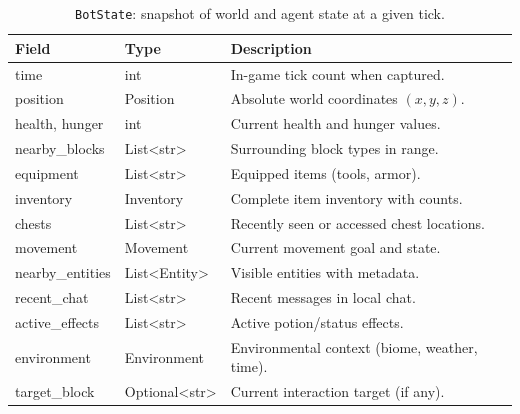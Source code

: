 \begin{table}[!htbp]
  \centering
  \caption{\texttt{BotState}: snapshot of world and agent state at a given tick.}
  \label{tab:botstate}
  \begin{tabularx}{\linewidth}{@{} l l X @{}}
    \toprule
    \textbf{Field} & \textbf{Type} & \textbf{Description} \\
    \midrule
    time & int & In-game tick count when captured. \\
    position & Position & Absolute world coordinates \((x,y,z)\). \\
    health, hunger & int & Current health and hunger values. \\
    nearby\_blocks & List\textless{}str\textgreater{} & Surrounding block types in range. \\
    equipment & List\textless{}str\textgreater{} & Equipped items (tools, armor). \\
    inventory & Inventory & Complete item inventory with counts. \\
    chests & List\textless{}str\textgreater{} & Recently seen or accessed chest locations. \\
    movement & Movement & Current movement goal and state. \\
    nearby\_entities & List\textless{}Entity\textgreater{} & Visible entities with metadata. \\
    recent\_chat & List\textless{}str\textgreater{} & Recent messages in local chat. \\
    active\_effects & List\textless{}str\textgreater{} & Active potion/status effects. \\
    environment & Environment & Environmental context (biome, weather, time). \\
    target\_block & Optional\textless{}str\textgreater{} & Current interaction target (if any). \\
    \bottomrule
  \end{tabularx}
\end{table}

\FloatBarrier
\vspace{8pt}

\vspace{2pt}
\FloatBarrier

